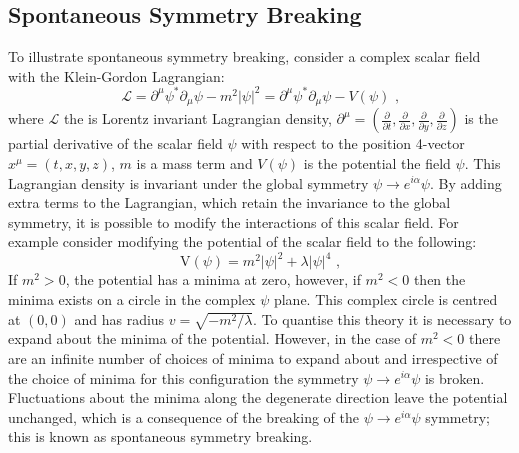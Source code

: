 
\subsection{Spontaneous Symmetry Breaking}
\label{sec:ssb}
To illustrate spontaneous symmetry breaking, consider a complex scalar field \psi with the Klein-Gordon Lagrangian:
%
\begin{equation}
\mathcal{L} = \partial^{\mu} \psi^{*} \partial_{\mu} \psi -m^{2} |\psi|^{2} = \partial^{\mu} \psi^{*} \partial_{\mu} \psi - V(\psi) \text{ ,}
\label{equ:kleingordon}
\end{equation}
%
\noindent where $\mathcal{L}$ the is Lorentz invariant Lagrangian density, $\partial^{\mu} = (\frac{\partial}{\partial{t}},\frac{\partial}{\partial{x}},\frac{\partial}{\partial{y}},\frac{\partial}{\partial{z}})$ is the partial derivative of the scalar field $\psi$ with respect to the position 4-vector $x^{\mu} = (t,x,y,z)$, $m$ is a mass term and $V(\psi)$ is the potential the field $\psi$.  This Lagrangian density is invariant under the global symmetry $\psi \rightarrow e^{i\alpha} \psi$.  By adding extra terms to the Lagrangian, which retain the invariance to the global symmetry, it is possible to modify the interactions of this scalar field.  For example consider modifying the potential of the scalar field to the following:
%
\begin{equation}
\text{V}(\psi) = m^{2}|\psi|^{2} + \lambda |\psi|^{4} \text{ ,}
\end{equation}
%
\noindent If $m^{2} > 0$, the potential has a minima at zero, however, if $m^{2} < 0$ then the minima exists on a circle in the complex $\psi$ plane.  This complex circle is centred at $(0,0)$ and has radius $v = \sqrt{-m^{2}/\lambda}$.  To quantise this theory it is necessary to expand about the minima of the potential.  However, in the case of $m^{2} < 0$ there are an infinite number of choices of minima to expand about and irrespective of the choice of minima for this configuration the symmetry $\psi \rightarrow e^{i\alpha} \psi$ is broken.  Fluctuations about the minima along the degenerate direction leave the potential unchanged, which is a consequence of the breaking of the $\psi \rightarrow e^{i\alpha} \psi$ symmetry; this is known as spontaneous symmetry breaking.

